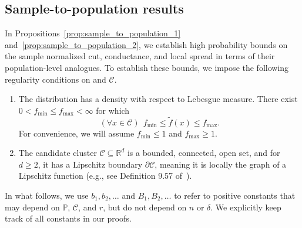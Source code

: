 \documentclass[11pt,twoside]{article}
\newcommand{\Reals}{\mathbb{R}}
\newcommand{\1}{\mathbf{1}}
\newcommand{\Rd}{\Reals^d}
\newcommand{\mc}[1]{\mathcal{#1}}
\newcommand{\Pbb}{\mathbb{P}}
\newcommand{\wt}[1]{\widetilde{#1}}
\begin{document}
\subsection{Sample-to-population results}
\label{subsec:sample_to_population}
In Propositions~\ref{prop:sample_to_population_1} and~\ref{prop:sample_to_population_2}, we establish high probability bounds on the sample normalized cut, conductance, and local spread in terms of their population-level analogues. To establish these bounds, we impose the following regularity conditions on \smash{$\wt{\Pbb}$} and $\mc{C}$.
\begin{enumerate}[label=(A\arabic*)]
	\item 
	\label{asmp:bounded_density} 
	The distribution \smash{$\wt{\Pbb}$} has a density \smash{$\wt{f}: \mc{C} \to (0,\infty)$} with respect to Lebesgue measure. There exist $0 < f_{\min} \leq f_{\max} < \infty$ for which
	\begin{equation*}
	(\forall x \in \mc{C})~~ f_{\min} \leq \wt{f}(x) \leq f_{\max}.
	\end{equation*}
	For convenience, we will assume $f_{\min} \leq 1$ and $f_{\max} \geq 1$.
	\item 
	\label{asmp:domain} 
	The candidate cluster $\mc{C} \subseteq \Rd$ is a bounded, connected, open set, and for $d \geq 2$, it has a Lipschitz boundary $\partial \mc{C}$, meaning it is locally the graph of a Lipschitz function (e.g., see Definition 9.57 of~\cite{leoni2017}).
\end{enumerate}

In what follows, we use $b_1,b_2,\ldots$ and $B_1,B_2,\ldots$ to refer to positive constants that may depend on $\Pbb$, $\mc{C}$, and $r$, but do not depend on $n$ or $\delta$. We explicitly keep track of all constants in our proofs.
\end{document}

